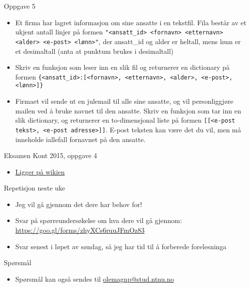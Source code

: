 \documentclass[screen, aspectratio=169]{beamer}
\begin{document}
\begin{frame}[fragile]{Oppgave 5}
	\begin{itemize}
		\item<+-> Et firma har lagret informasjon om sine ansatte i en tekstfil. Fila består av et ukjent antall linjer på formen \lstinline|"<ansatt_id> <fornavn> <etternavn> <alder> <e-post> <lønn>"|, der ansatt\_id og alder er heltall, mens lønn er et desimaltall (anta at punktum brukes i desimaltall)
		\item<+-> Skriv en funksjon som leser inn en slik fil og returnerer en dictionary på formen \lstinline|{<ansatt_id>:[<fornavn>, <etternavn>, <alder>, <e-post>, <lønn>]}|
		\item<+-> Firmaet vil sende ut en julemail til alle sine ansatte, og vil personliggjøre mailen ved å bruke navnet til den ansatte. Skriv en funksjon som tar inn en slik dictionary, og returnerer en to-dimensjonal liste på formen \lstinline|[[<e-post tekst>, <e-post adresse>]]|. E-post teksten kan være det du vil, men må inneholde iallefall fornavnet på den ansatte.
	\end{itemize}
\end{frame}

\begin{frame}{Eksamen Kont 2015, oppgave 4}
	\begin{itemize}
		\item<+-> \href{https://www.ntnu.no/wiki/display/tdt4110/Python+eksamensoppgaver?preview=/78972128/87197643/2015-08-05-tdt4110-bm-kont.pdf}{Ligger på wikien}
	\end{itemize}
\end{frame}

\begin{frame}{Repetisjon neste uke}
	\begin{itemize}
		\item Jeg vil gå gjennom det dere har behov for!
		\item Svar på spørreundersøkelse om hva dere vil gå gjennom:  \href{https://goo.gl/forms/zhyXCs6ruuJFmOz83}{https://goo.gl/forms/zhyXCs6ruuJFmOz83}
		\item Svar senest i løpet av søndag, så jeg har tid til å forberede forelesninga
	\end{itemize}
\end{frame}

\begin{frame}{Spørsmål}
	\begin{itemize}
		\item Spørsmål kan også sendes til \href{mailto::olemagnp@stud.ntnu.no}{olemagnp@stud.ntnu.no}
	\end{itemize}
\end{frame}
\end{document}
